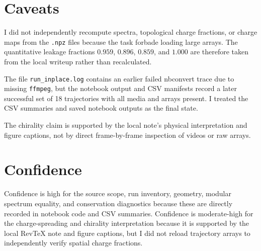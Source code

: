 \documentclass[aps,prb,onecolumn,nofootinbib,superscriptaddress]{revtex4-2}
\begin{document}
\section{Caveats}

I did not independently recompute spectra, topological charge fractions, or charge maps from the \texttt{.npz} files because the task forbade loading large arrays.  The quantitative leakage fractions \(0.959\), \(0.896\), \(0.859\), and \(1.000\) are therefore taken from the local writeup rather than recalculated.

The file \texttt{run\_inplace.log} contains an earlier failed nbconvert trace due to missing \texttt{ffmpeg}, but the notebook output and CSV manifests record a later successful set of 18 trajectories with all media and arrays present.  I treated the CSV summaries and saved notebook outputs as the final state.

The chirality claim is supported by the local note's physical interpretation and figure captions, not by direct frame-by-frame inspection of videos or raw arrays.

\section{Confidence}

Confidence is high for the source scope, run inventory, geometry, modular spectrum equality, and conservation diagnostics because these are directly recorded in notebook code and CSV summaries.  Confidence is moderate-high for the charge-spreading and chirality interpretation because it is supported by the local RevTeX note and figure captions, but I did not reload trajectory arrays to independently verify spatial charge fractions.
\end{document}
